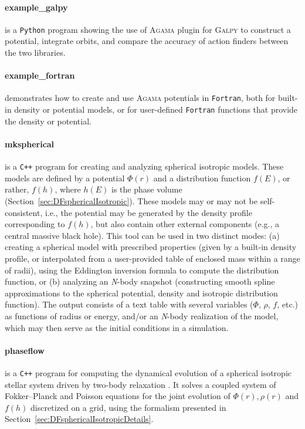 \documentclass[12pt]{article}
\newcommand{\Agama}{\textsc{Agama}\xspace}
\newcommand{\Galpy}{\textsc{Galpy}\xspace}
\newcommand{\Nbody}{\textsl{N}-body\xspace}
\newcommand{\Cpp}  {\texttt{C++}\xspace}
\newcommand{\Python}{\texttt{Python}\xspace}
\newcommand{\Fortran}{\texttt{Fortran}\xspace}
\begin{document}
\paragraph{example_galpy} is a \Python program showing the use of \Agama plugin for \Galpy to construct a potential, integrate orbits, and compare the accuracy of action finders between the two libraries. 

\paragraph{example_fortran} demonstrates how to create and use \Agama potentials in \Fortran, both for built-in density or potential models, or for user-defined \Fortran functions that provide the density or potential.

\label{sec:mkspherical}%
\paragraph{mkspherical} is a \Cpp program for creating and analyzing spherical isotropic models. These models are defined by a potential $\Phi(r)$ and a distribution function $f(E)$, or rather, $f(h)$, where $h(E)$ is the phase volume (Section~\ref{sec:DFsphericalIsotropic}). These models may or may not be self-consistent, i.e., the potential may be generated by the density profile corresponding to $f(h)$, but also contain other external components (e.g., a central massive black hole). This tool can be used in two distinct modes: (a) creating a spherical model with prescribed properties (given by a built-in density profile, or interpolated from a user-provided table of enclosed mass within a range of radii), using the Eddington inversion formula to compute the distribution function, or (b) analyzing an \Nbody snapshot (constructing smooth spline approximations to the spherical potential, density and isotropic distribution function). The output consists of a text table with several variables ($\Phi$, $\rho$, $f$, etc.) as functions of radius or energy, and/or an \Nbody realization of the model, which may then serve as the initial conditions in a simulation.

\paragraph{phaseflow} is a \Cpp program for computing the dynamical evolution of a spherical isotropic stellar system driven by two-body relaxation \cite{Vasiliev2017}. It solves a coupled system of Fokker--Planck and Poisson equations for the joint evolution of $\Phi(r), \rho(r)$ and $f(h)$ discretized on a grid, using the formalism presented in Section~\ref{sec:DFsphericalIsotropicDetails}.
\end{document}
